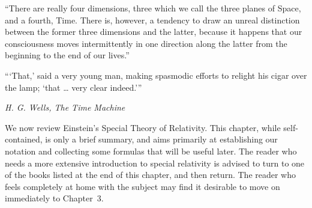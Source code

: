 
\begin{flushright}
\begin{minipage}{0.34\textwidth}
\small
``There are really four dimensions, three which we call the three planes of
Space, and a fourth, Time. There is, however, a tendency to draw an unreal
distinction between the former three dimensions and the latter, because it
happens that our consciousness moves intermittently in one direction along the
latter from the beginning to the end of our lives.''

```That,' said a very young man, making spasmodic efforts to relight his cigar
over the lamp; `that \ldots{} very clear indeed.'''

\emph{H. G. Wells, The Time Machine}
\end{minipage}
\end{flushright}

We now review Einstein's Special Theory of Relativity. This chapter, while
self-contained, is only a brief summary, and aims primarily at establishing our
notation and collecting some formulas that will be useful later. The reader who
needs a more extensive introduction to special relativity is advised to turn to
one of the books listed at the end of this chapter, and then return. The reader
who feels completely at home with the subject may find it desirable to move on
immediately to Chapter~3.
